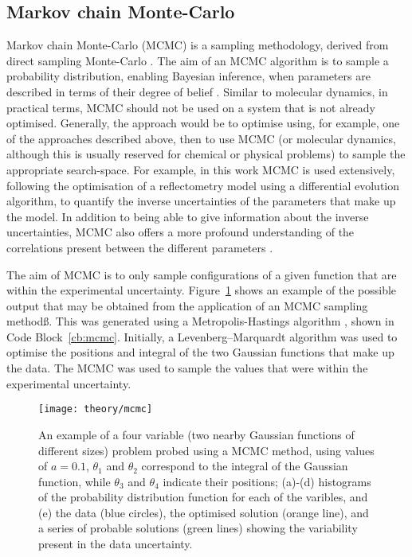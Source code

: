 \subsection{Markov chain Monte-Carlo}
\label{sec:mcmc}
Markov chain Monte-Carlo (MCMC) is a sampling methodology, derived from direct sampling Monte-Carlo \cite{krauth_statistical_2006}.
The aim of an MCMC algorithm is to sample a probability distribution, enabling Bayesian inference, when parameters are described in terms of their degree of belief \cite{sivia_data_2006}.
Similar to molecular dynamics, in practical terms, MCMC should not be used on a system that is not already optimised.
Generally, the approach would be to optimise using, for example, one of the approaches described above, then to use MCMC (or molecular dynamics, although this is usually reserved for chemical or physical problems) to sample the appropriate search-space.
For example, in this work MCMC is used extensively, following the optimisation of a reflectometry model using a differential evolution algorithm, to quantify the inverse uncertainties of the parameters that make up the model.
In addition to being able to give information about the inverse uncertainties, MCMC also offers a more profound understanding of the correlations present between the different parameters \cite{gilks_markov_1995}.

The aim of MCMC is to only sample configurations of a given function that are within the experimental uncertainty.
Figure~\ref{fig:mcmc} shows an example of the possible output that may be obtained from the application of an MCMC sampling methodß.
This was generated using a Metropolis-Hastings algorithm \cite{metropolis_equation_1953,hastings_monte_1970}, shown in Code Block~\ref{cb:mcmc}.
Initially, a Levenberg–Marquardt algorithm \cite{levenberg_method_1944,marquardt_algorithm_1963} was used to optimise the positions and integral of the two Gaussian functions that make up the data.
The MCMC was used to sample the values that were within the experimental uncertainty.
%
\begin{figure}
    \centering
    \texttt{[image: theory/mcmc]}
    \caption{An example of a four variable (two nearby Gaussian functions of different sizes) problem probed using a MCMC method, using values of $a=0.1$, $\theta_1$ and $\theta_2$ correspond to the integral of the Gaussian function, while $\theta_3$ and $\theta_4$ indicate their positions; (a)-(d) histograms of the probability distribution function for each of the varibles, and (e) the data (blue circles), the optimised solution (orange line), and a series of probable solutions (green lines) showing the variability present in the data uncertainty.}
    \label{fig:mcmc}
\end{figure}
%
\begin{figure}
    \centering
        
\end{figure}
%

